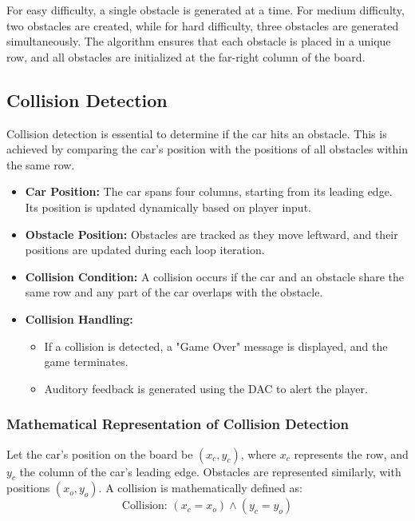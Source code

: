 \documentclass[conference]{IEEEtran}
\begin{document}
For easy difficulty, a single obstacle is generated at a time. For medium difficulty, two obstacles are created, while for hard difficulty, three obstacles are generated simultaneously. The algorithm ensures that each obstacle is placed in a unique row, and all obstacles are initialized at the far-right column of the board.

\subsection{Collision Detection}  
Collision detection is essential to determine if the car hits an obstacle. This is achieved by comparing the car's position with the positions of all obstacles within the same row.  

\begin{itemize}  
    \item \textbf{Car Position:} The car spans four columns, starting from its leading edge. Its position is updated dynamically based on player input.  
    \item \textbf{Obstacle Position:} Obstacles are tracked as they move leftward, and their positions are updated during each loop iteration.  
    \item \textbf{Collision Condition:} A collision occurs if the car and an obstacle share the same row and any part of the car overlaps with the obstacle.  
    \item \textbf{Collision Handling:}  
        \begin{itemize}  
            \item If a collision is detected, a "Game Over" message is displayed, and the game terminates.  
            \item Auditory feedback is generated using the DAC to alert the player.  
        \end{itemize}  
\end{itemize}  

\subsubsection*{Mathematical Representation of Collision Detection}  
Let the car's position on the board be \((x_c, y_c)\), where \(x_c\) represents the row, and \(y_c\) the column of the car's leading edge. Obstacles are represented similarly, with positions \((x_o, y_o)\). A collision is mathematically defined as:  
\begin{equation}  
\text{Collision: } (x_c = x_o) \land (y_c = y_o)  
\end{equation}  
\end{document}
